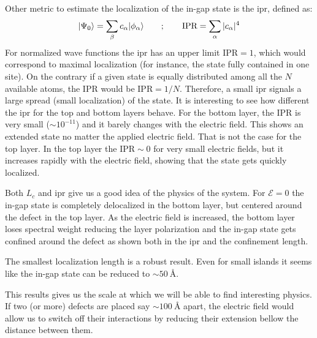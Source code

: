 Other metric to estimate the localization of the in-gap state is the \acf{ipr}, defined as:
\begin{equation}
  |\Psi_0\rangle = \sum_\beta c_\alpha|\phi_\alpha\rangle\quad\quad;\quad\quad
  \text{IPR} = \sum_\alpha |c_\alpha|^4
\end{equation}
For normalized wave functions the \ac{ipr} has an upper limit $\text{IPR}=1$, which would correspond to maximal localization (for instance, the state fully contained in one site). On the contrary if a given state is equally distributed among all the $N$ available atoms, the IPR would be $\text{IPR}=1/N$. Therefore, a small \ac{ipr} signals a large spread (small localization) of the state.
It is interesting to see how different the \ac{ipr} for the top and bottom layers behave.
For the bottom layer, the IPR is very small ($\sim10^{-11}$) and it barely changes with the electric field. This shows an extended state no matter the applied electric field.
That is not the case for the top layer. In the top layer the $\text{IPR}\sim0$ for very small electric fields, but it increases rapidly with the electric field, showing that the state gets quickly localized.
\medskip

Both $L_c$ and \ac{ipr} give us a good idea of the physics of the system. For $\mathcal{E}=0$ the in-gap state is completely delocalized in the bottom layer, but centered around the defect in the top layer.
As the electric field is increased, the bottom layer loses spectral weight reducing the layer polarization and the in-gap state gets confined around the defect as shown both in the \ac{ipr} and the confinement length.
\smallskip

The smallest localization length is a robust result. Even for small islands it seems like the in-gap state can be reduced to $\sim\SI{50}{\angstrom}$.
\smallskip

This results gives us the scale at which we will be able to find interesting physics. If two (or more) defects are placed say $\sim\SI{100}{\angstrom}$ apart, the electric field would allow us to switch off their interactions by reducing their extension bellow the distance between them.





